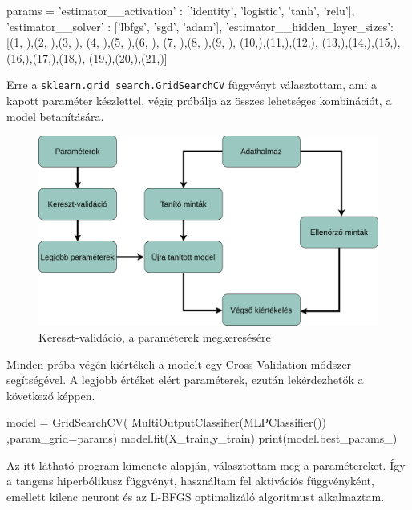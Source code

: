 \begin{python}
params = {
            'estimator__activation' : ['identity', 'logistic',
            			       'tanh', 'relu'],
            'estimator__solver' : ['lbfgs', 'sgd', 'adam'],
            'estimator__hidden_layer_sizes': [(1, ),(2, ),(3, ),
            				      (4, ),(5, ),(6, ),
            				      (7, ),(8, ),(9, ),
            				      (10,),(11,),(12,),
            				      (13,),(14,),(15,),
            				      (16,),(17,),(18,),
            				      (19,),(20,),(21,)]
}
\end{python}

Erre a \texttt{sklearn.grid\_search.GridSearchCV} függvényt választottam, ami a kapott paraméter készlettel, végig próbálja az összes lehetséges kombinációt, a model betanítására.

\begin{figure}[h!]
\centering
\includegraphics[scale=0.3]{images/gridSearch.png}
\caption{Kereszt-validáció, a paraméterek megkeresésére}
\label{fig:neuralnetwork}
\end{figure}

Minden próba végén kiértékeli a modelt egy Cross-Validation módszer segítségével. A legjobb értéket elért paraméterek, ezután lekérdezhetők a következő képpen.

\begin{python}
model = GridSearchCV( MultiOutputClassifier(MLPClassifier())
  ,param_grid=params)
model.fit(X_train,y_train)
print(model.best_params_)
\end{python} 

Az itt látható program kimenete alapján, választottam meg a paramétereket.
Így a tangens hiperbólikusz függvényt, használtam fel aktivációs függvényként, emellett kilenc neuront és az L-BFGS optimalizáló algoritmust alkalmaztam.

